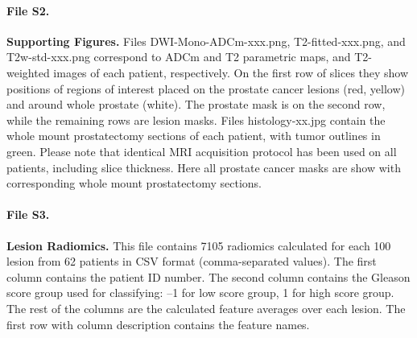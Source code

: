 \documentclass[10pt,letterpaper]{article}
\begin{document}
\paragraph*{File S2.}
\label{S2_File}
{\bf Supporting Figures.}
Files DWI-Mono-ADCm-xxx.png, T2-fitted-xxx.png, and T2w-std-xxx.png correspond
to ADCm and T2 parametric maps, and T2-weighted images of each patient,
respectively. On the first row of slices they show positions of regions of
interest placed on the prostate cancer lesions (red, yellow) and around whole
prostate (white). The prostate mask is on the second row, while the remaining
rows are lesion masks. Files histology-xx.jpg contain the whole mount
prostatectomy sections of each patient, with tumor outlines in green. Please
note that identical MRI acquisition protocol has been used on all patients,
including slice thickness. Here all prostate cancer masks are show with
corresponding whole mount prostatectomy sections.

\paragraph*{File S3.}
\label{S3_File}
{\bf Lesion Radiomics.}
This file contains 7105 radiomics calculated for each 100 lesion from 62
patients in CSV format (comma-separated values). The first column contains the
patient ID number. The second column contains the Gleason score group used for
classifying: --1 for low score group, 1 for high score group. The rest of the
columns are the calculated feature averages over each lesion. The first row with
column description contains the feature names. 
\end{document}

